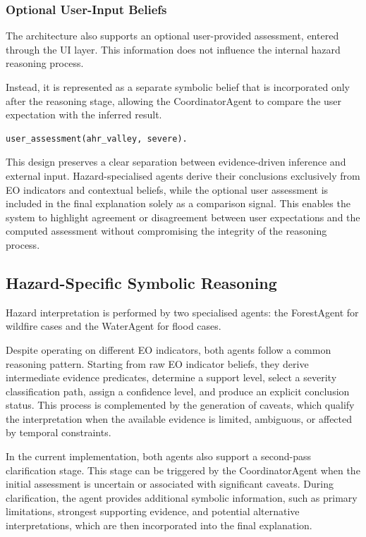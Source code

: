 \documentclass[12pt]{article}
\begin{document}
\subsubsection{Optional User-Input Beliefs}

The architecture also supports an optional user-provided assessment, entered through the UI layer. This information does not influence the internal hazard reasoning process.

Instead, it is represented as a separate symbolic belief that is incorporated only after the reasoning stage, allowing the CoordinatorAgent to compare the user expectation with the inferred result.

\begin{lstlisting}
user_assessment(ahr_valley, severe).
\end{lstlisting}

This design preserves a clear separation between evidence-driven inference and external input. Hazard-specialised agents derive their conclusions exclusively from EO indicators and contextual beliefs, while the optional user assessment is included in the final explanation solely as a comparison signal. This enables the system to highlight agreement or disagreement between user expectations and the computed assessment without compromising the integrity of the reasoning process.

\subsection{Hazard-Specific Symbolic Reasoning}

Hazard interpretation is performed by two specialised agents: the ForestAgent for wildfire cases and the WaterAgent for flood cases.

Despite operating on different EO indicators, both agents follow a common reasoning pattern. Starting from raw EO indicator beliefs, they derive intermediate evidence predicates, determine a support level, select a severity classification path, assign a confidence level, and produce an explicit conclusion status. This process is complemented by the generation of caveats, which qualify the interpretation when the available evidence is limited, ambiguous, or affected by temporal constraints.

In the current implementation, both agents also support a second-pass clarification stage. This stage can be triggered by the CoordinatorAgent when the initial assessment is uncertain or associated with significant caveats. During clarification, the agent provides additional symbolic information, such as primary limitations, strongest supporting evidence, and potential alternative interpretations, which are then incorporated into the final explanation.
\end{document}
